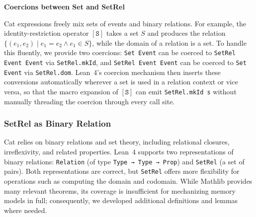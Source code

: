 \textbf{Coercions between Set and SetRel}

Cat expressions freely mix sets of events and binary relations. For example, the identity-restriction operator $[\mathtt{S}]$ takes a set $S$ and produces the relation $\{(e_1, e_2) \mid e_1 = e_2 \wedge e_1 \in S\}$, while the domain of a relation is a set. To handle this fluently, we provide two coercions: \texttt{Set Event} can be coerced to \texttt{SetRel Event Event} via \texttt{SetRel.mkId}, and \texttt{SetRel Event Event} can be coerced to \texttt{Set Event} via \texttt{SetRel.dom}. Lean~4's coercion mechanism then inserts these conversions automatically wherever a set is used in a relation context or vice versa, so that the macro expansion of $[\mathtt{S}]$ can emit \texttt{SetRel.mkId s} without manually threading the coercion through every call site.

\subsubsection{SetRel as Binary Relation}
\label{sec:design:theorems}
Cat relies on binary relations and set theory, including relational closures, irreflexivity, and related properties. Lean~4 supports two representations of binary relations: \texttt{Relation} (of type \texttt{Type → Type → Prop}) and \texttt{SetRel} (a set of pairs). Both representations are correct, but \texttt{SetRel} offers more flexibility for operations such as computing the domain and codomain. While Mathlib provides many relevant theorems, its coverage is insufficient for mechanizing memory models in full; consequently, we developed additional definitions and lemmas where needed.
